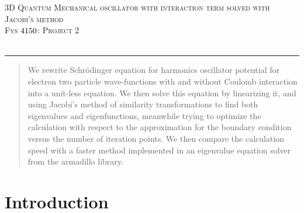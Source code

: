 \documentclass[a4paper,11pt]{article}
\newcommand*{\boisik}{\fontfamily{bsk}\selectfont} %
\begin{document}
{
\SetBgVshift{-1.2cm}
\SetBgHshift{-10.5cm}
$$\:$$
\begin{center}
	\vspace{0.2cm}%
	\fontsize{15}{15}\selectfont \textsc{ 3D Quantum Mechanical oscillator with interaction term solved with Jacobi's method}\\
	\fontsize{13}{13}\selectfont \textsc{Fys $\textnormal{{4150}}$: Project 2}\\
	\vspace{0.4cm}
	\fontsize{12}{12}\\
	\vspace{0.5cm}
\end{center}
	
\rule{\textwidth}{0.3pt}\par
		
\begin{abstract}
	We rewrite Schrödinger equation for harmonics oscillator potential for electron two particle wave-functions with and without Coulomb interaction into a unit-less equation. We then solve this equation by linearizing it, and using Jacobi's method of similarity transformations \cite{M.Hjort-Jensen_CompFys} to find both eigenvalues and eigenfunctions, meanwhile trying to optimize the calculation with respect to the approximation for the boundary condition versus the number of iteration points. We then compare the calculation speed with a faster method implemented in an eigenvalue equation solver from the armadillo library\cite{Armadillo}.
\end{abstract}



		
\section*{Introduction}

}
\end{document}
